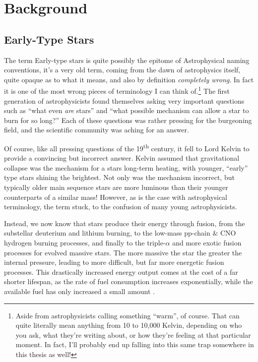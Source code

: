 \chapter{Background}

\section{Early-Type Stars}
\label{sec:earlytype}

The term Early-type stars is quite possibly the epitome of Astrophysical naming conventions, it's a very old term, coming from the dawn of astrophysics itself, quite opaque as to what it means, and also by definition \textit{completely wrong}. In fact it is one of the most wrong pieces of terminology I can think of.\footnote{Aside from astrophysicists calling something ``warm'', of course. That can quite literally mean anything from 10 to 10,000 Kelvin, depending on who you ask, what they're writing about, or how they're feeling at that particular moment. In fact, I'll probably end up falling into this same trap somewhere in this thesis as well!}
The first generation of astrophysicists found themselves asking very important questions such as ``what even \textit{are} stars'' and ``what possible mechanism can allow a star to burn for so long?'' Each of these questions was rather pressing for the burgeoning field, and the scientific community was aching for an answer.

Of course, like all pressing questions of the 19\textsuperscript{th} century, it fell to Lord Kelvin to provide a convincing but incorrect answer. Kelvin assumed that gravitational collapse was the mechanism for a stars long-term heating, with younger, ``early'' type stars shining the brightest. Not only was the mechanism incorrect, but typically older main sequence stars are more luminous than their younger counterparts of a similar mass! However, as is the case with astrophysical terminology, the term stuck, to the confusion of many young astrophysicists.



Instead, we now know that stars produce their energy through fusion, from the substellar deuterium and lithium burning, to the low-mass pp-chain \& CNO hydrogen burning processes, and finally to the triple-$\alpha$ and more exotic fusion processes for evolved massive stars. The more massive the star the greater the internal pressure, leading to more difficult, but far more energetic fusion processes. This drastically increased energy output comes at the cost of a far shorter lifespan, as the rate of fuel consumption increases exponentially, while the available fuel has only increased a small amount \cite{carrollIntroductionModernAstrophysics2014}.

